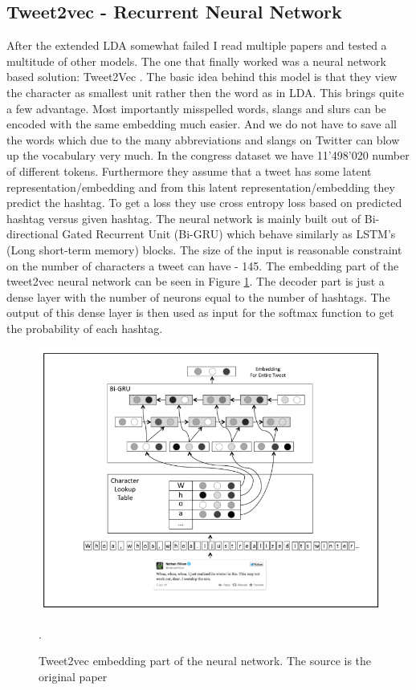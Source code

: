 \documentclass[10pt,conference,compsocconf]{IEEEtran}
\begin{document}
\subsection{Tweet2vec - Recurrent Neural Network}
After the extended LDA somewhat failed I read multiple papers and tested a multitude of other models. The one that finally worked was a neural network based solution: Tweet2Vec \cite{DhingraZFMC16}. The basic idea behind this model is that they view the character as smallest unit rather then the word as in LDA. This brings quite a few advantage. Most importantly misspelled words, slangs and slurs can be encoded with the same embedding much easier. And we do not have to save all the words which due to the many abbreviations and slangs on Twitter can blow up the vocabulary very much. In the congress dataset we have 11'498'020 number of different tokens. Furthermore they assume that a tweet has some latent representation/embedding and from this latent representation/embedding they predict the hashtag. To get a loss they use cross entropy loss based on predicted hashtag versus given hashtag. The neural network is mainly built out of Bi-directional Gated Recurrent Unit (Bi-GRU) which behave similarly as LSTM's (Long short-term memory) blocks. The size of the input is reasonable constraint on the number of characters a tweet can have - 145. The embedding part of the tweet2vec neural network can be seen in Figure \ref{fig:tweet2vecembedding}. The decoder part is just a dense layer with the number of neurons equal to the number of hashtags. The output of this dense layer is then used as input for the softmax function to get the probability of each hashtag. 
\begin{figure}
	\centering
	\includegraphics[width=0.7\linewidth]{images/tweet2vec_embedding}
	\caption{Tweet2vec embedding part of the neural network. The source is the original paper \cite{DhingraZFMC16}}.
	\label{fig:tweet2vecembedding}
\end{figure}
\end{document}
